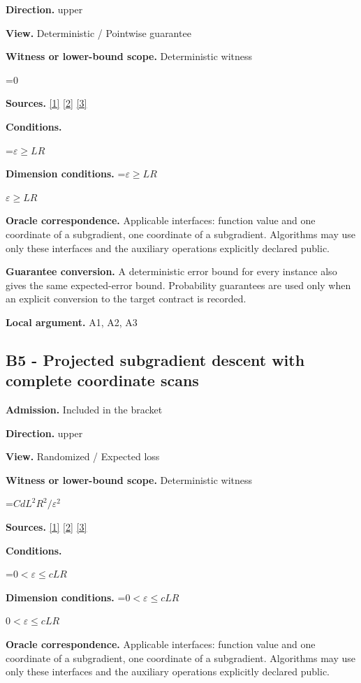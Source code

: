 \documentclass[10pt,a4paper]{article}
\newcommand{\AtlasMath}[1]{\par\begingroup\centering\setbox0=\hbox{$\displaystyle #1$}\ifdim\wd0>1.4\linewidth\typeout{ATLAS WIDE FORMULA: \the\wd0}\fi\ifdim\wd0>\linewidth\resizebox{\linewidth}{!}{\box0}\else\box0\fi\par\endgroup}
\newcommand{\AtlasInlineMath}[1]{\begingroup\setbox0=\hbox{$#1$}\ifdim\wd0>.4\linewidth\endgroup\AtlasMath{#1}\else\endgroup$#1$\fi}
\begin{document}
\textbf{Direction.} upper

\textbf{View.} Deterministic / Pointwise guarantee

\textbf{Witness or lower-bound scope.} Deterministic witness

\AtlasMath{0}
\textbf{Sources.} \href{https://arxiv.org/pdf/1405.4980}{[1]} \href{https://www2.isye.gatech.edu/~nemirovs/MOR_AccuracyCertificates.pdf}{[2]} \href{https://arxiv.org/pdf/2609.20701}{[3]}

\textbf{Conditions.} 
\AtlasMath{\varepsilon\ge LR}


\textbf{Dimension conditions.} \AtlasInlineMath{\varepsilon\ge LR}

\textbf{Oracle correspondence.} Applicable interfaces: function value and one coordinate of a subgradient, one coordinate of a subgradient. Algorithms may use only these interfaces and the auxiliary operations explicitly declared public.

\textbf{Guarantee conversion.} A deterministic error bound for every instance also gives the same expected-error bound. Probability guarantees are used only when an explicit conversion to the target contract is recorded.

\textbf{Local argument.} A1, A2, A3

\subsection{B5 - Projected subgradient descent with complete coordinate scans}
\textbf{Admission.} Included in the bracket

\textbf{Direction.} upper

\textbf{View.} Randomized / Expected loss

\textbf{Witness or lower-bound scope.} Deterministic witness

\AtlasMath{CdL^2R^2/\varepsilon^2}
\textbf{Sources.} \href{https://arxiv.org/pdf/1405.4980}{[1]} \href{https://www2.isye.gatech.edu/~nemirovs/MOR_AccuracyCertificates.pdf}{[2]} \href{https://arxiv.org/pdf/2609.20701}{[3]}

\textbf{Conditions.} 
\AtlasMath{0<\varepsilon\le cLR}


\textbf{Dimension conditions.} \AtlasInlineMath{0<\varepsilon\le cLR}

\textbf{Oracle correspondence.} Applicable interfaces: function value and one coordinate of a subgradient, one coordinate of a subgradient. Algorithms may use only these interfaces and the auxiliary operations explicitly declared public.
\end{document}
